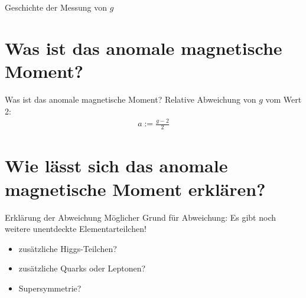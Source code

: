 \documentclass[12pt]{beamer}
\begin{document}
\begin{frame}{Geschichte der Messung von $g$}
\end{frame}


\section{Was ist das anomale magnetische Moment?}

\begin{frame}{Was ist das anomale magnetische Moment?}
  Relative Abweichung von $g$ vom Wert 2:
  \begin{align*}
    a := \frac{g-2}{2}
  \end{align*}
\end{frame}


\section{Wie lässt sich das anomale magnetische Moment erklären?}

\begin{frame}{Erklärung der Abweichung}
  Möglicher Grund für Abweichung: Es gibt noch weitere unentdeckte
  Elementarteilchen!
  \begin{itemize}
  \item zusätzliche Higgs-Teilchen?
  \item zusätzliche Quarks oder Leptonen?
  \item Supersymmetrie?
  \end{itemize}
\end{frame}
\end{document}
